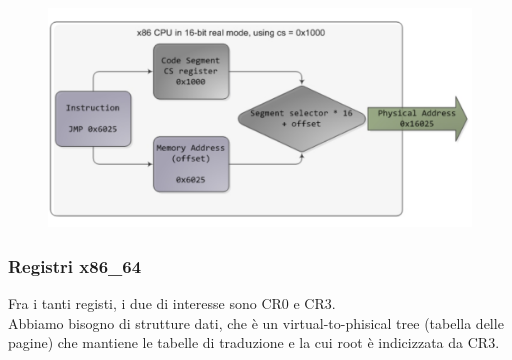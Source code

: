 \documentclass[12pt, oneside]{extbook} %
\begin{document}
\begin{figure}[!h]
	\includegraphics[scale=0.3]{immagini/seg_based_transl.png}
\end{figure}

\subsubsection{Registri x86\_64}
Fra i tanti registi, i due di interesse sono CR0 e CR3.\\Abbiamo bisogno di strutture dati, che è un virtual-to-phisical tree (tabella delle pagine) che mantiene le tabelle di traduzione e la cui root è indicizzata da CR3.
\end{document}
